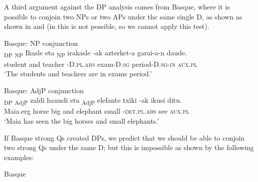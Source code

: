 \documentclass[output=paper,
modfonts
]{langscibook}
\begin{document}
A third argument against the DP analysis comes from Basque, where it is possible to conjoin two NPs or two APs under the same single D, as shown as shown in  and  (in  this is not possible, so we cannot apply this test).\newpage 

\ea\label{ex:etxeberria:31}
	Basque: {NP conjunction}\\
	\gll {\ob}\textsubscript{\textnormal{DP}} {\ob}\textsubscript{\textnormal{NP}} {Ikasle}{\cb} {eta} {\ob}\textsubscript{\textnormal{NP}} {irakasle}{\cb} -{ak}{\cb} {azterket-a} {garai-a-n} {daude}.\\
	{\ob} {\ob} student{\cb} and {\ob} teacher{\cb} -D.\textsc{pl.abs}{\cb} exam-D.\textsc{sg} period-D.\textsc{sg-in} \textsc{aux.pl}\\
	\glt `The students and teachers are in exams period.'
\z

\ea\label{ex:etxeberria:32}
	Basque: {AdjP conjunction}\\
 {\ob}\textsubscript{\textnormal{DP}} {\ob}\textsubscript{\textnormal{AdjP}} {zaldi} {haundi}{\cb} {eta} {\ob}\textsubscript{\textnormal{AdjP}} {elefante} {txiki}{\cb} -{ak}{\cb} {ikusi} {ditu}.\\
Maia.erg {\ob} {\ob} horse big{\cb} and {\ob} elephant small{\cb} -\textsc{det.pl.abs}{\cb} see \textsc{aux.pl}\\
\glt `Maia has seen the big horses and small elephants.'
\z

If Basque strong Qs created DPs, we  predict that we should be able to conjoin two strong Qs under the same D; but this is impossible as shown by the following examples:

\ea\label{ex:etxeberria:33} 
Basque \\
\z
\z
\end{document}
